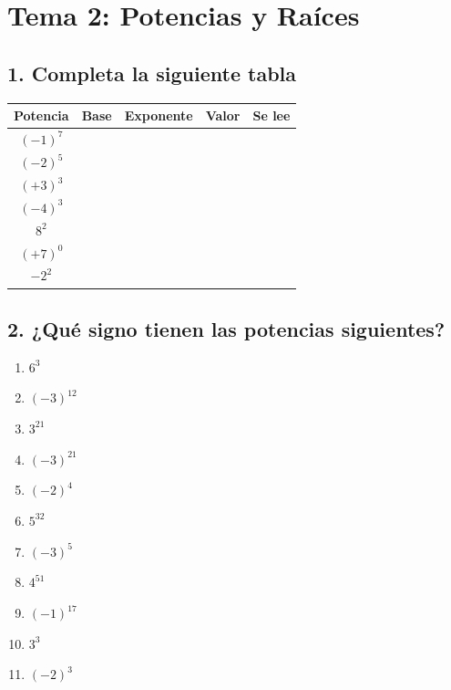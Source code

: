 \documentclass[a4paper,12pt]{article}
\begin{document}
\section*{Tema 2: Potencias y Raíces}

\subsection*{1. Completa la siguiente tabla}

\begin{center}
\renewcommand{\arraystretch}{1.5}
\begin{tabular}{|c|c|c|c|c|}
\hline
\textbf{Potencia} & \textbf{Base} & \textbf{Exponente} & \textbf{Valor} & \textbf{Se lee} \\ \hline
$(-1)^{7}$ & & & & \\ \hline
$(-2)^{5}$ & & & & \\ \hline
$(+3)^{3}$ & & & & \\ \hline
$(-4)^{3}$ & & & & \\ \hline
$8^{2}$ & & & & \\ \hline
$(+7)^{0}$ & & & & \\ \hline
$-2^{2}$ & & & & \\ \hline
\end{tabular}
\end{center}

\vspace{0.5cm}

\subsection*{2. ¿Qué signo tienen las potencias siguientes?}

\begin{enumerate}[label=\alph*)]
    \item $6^{3}$
    \item $(-3)^{12}$
    \item $3^{21}$
    \item $(-3)^{21}$
    \item $(-2)^{4}$
    \item $5^{32}$
    \item $(-3)^{5}$
    \item $4^{51}$
    \item $(-1)^{17}$
    \item $3^{3}$
    \item $(-2)^{3}$
\end{enumerate}
\end{document}
